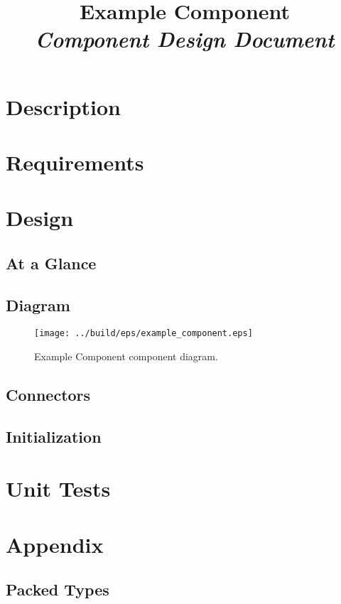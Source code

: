 



\title{\textbf{Example Component} \\
\large\textit{Component Design Document}}
\date{}
\maketitle

\section{Description}


\section{Requirements}


\section{Design}

\subsection{At a Glance}


\subsection{Diagram}
\begin{figure}[H]
  \texttt{[image: ../build/eps/example\_component.eps]}
  \caption{Example Component component diagram.}
\end{figure}

\subsection{Connectors}


\subsection{Initialization}


\section{Unit Tests}



\section{Appendix}
\subsection{Packed Types}




